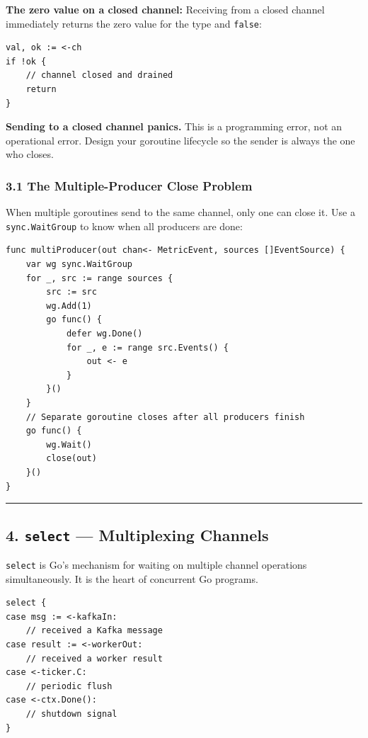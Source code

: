 \documentclass[11pt,a4paper,oneside]{book}
\begin{document}
\textbf{The zero value on a closed channel:} Receiving from a closed
channel immediately returns the zero value for the type and
\texttt{false}:

\begin{verbatim}
val, ok := <-ch
if !ok {
    // channel closed and drained
    return
}
\end{verbatim}

\textbf{Sending to a closed channel panics.} This is a programming
error, not an operational error. Design your goroutine lifecycle so the
sender is always the one who closes.

\subsubsection{3.1 The Multiple-Producer Close
Problem}

When multiple goroutines send to the same channel, only one can close
it. Use a \texttt{sync.WaitGroup} to know when all producers are done:

\begin{verbatim}
func multiProducer(out chan<- MetricEvent, sources []EventSource) {
    var wg sync.WaitGroup
    for _, src := range sources {
        src := src
        wg.Add(1)
        go func() {
            defer wg.Done()
            for _, e := range src.Events() {
                out <- e
            }
        }()
    }
    // Separate goroutine closes after all producers finish
    go func() {
        wg.Wait()
        close(out)
    }()
}
\end{verbatim}

\begin{center}\rule{0.5\linewidth}{0.5pt}\end{center}

\subsection{\texorpdfstring{4. \texttt{select} --- Multiplexing
Channels}{4. select --- Multiplexing Channels}}

\texttt{select} is Go's mechanism for waiting on multiple channel
operations simultaneously. It is the heart of concurrent Go programs.

\begin{verbatim}
select {
case msg := <-kafkaIn:
    // received a Kafka message
case result := <-workerOut:
    // received a worker result
case <-ticker.C:
    // periodic flush
case <-ctx.Done():
    // shutdown signal
}
\end{verbatim}
\end{document}
